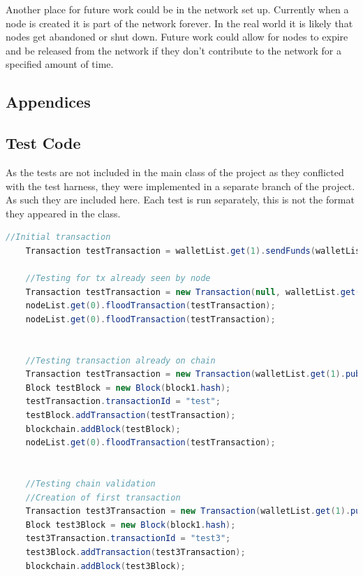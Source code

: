 \documentclass{l4proj}
\begin{document}
Another place for future work could be in the network set up. Currently when a node is created it is part of the
network forever. In the real world it is likely that nodes get abandoned or shut down. Future work could allow for 
nodes to expire and be released from the network if they don't contribute to the network for a specified amount of time.


\begin{appendices}

\chapter{Appendices}

\section{Test Code}
As the tests are not included in the main class of the project as they conflicted with the test harness, they were implemented
in a separate branch of the project. As such they are included here. Each test is run separately, this is not the format they appeared
in the class.

\begin{lstlisting}[language=java, float=h
    , label=lst:testCode]
    //Initial transaction
    Transaction testTransaction = walletList.get(1).sendFunds(walletList.get(2).publicKey, 10);

    //Testing for tx already seen by node
    Transaction testTransaction = new Transaction(null, walletList.get(2).publicKey,10, null, blockchain);
    nodeList.get(0).floodTransaction(testTransaction);
    nodeList.get(0).floodTransaction(testTransaction);


    //Testing transaction already on chain
    Transaction testTransaction = new Transaction(walletList.get(1).publicKey, walletList.get(2).publicKey, 10, null, blockchain);
    Block testBlock = new Block(block1.hash);
    testTransaction.transactionId = "test";
    testBlock.addTransaction(testTransaction);
    blockchain.addBlock(testBlock);
    nodeList.get(0).floodTransaction(testTransaction);


    //Testing chain validation
    //Creation of first transaction
    Transaction test3Transaction = new Transaction(walletList.get(1).publicKey, walletList.get(2).publicKey, 10, null, blockchain);
    Block test3Block = new Block(block1.hash);
    test3Transaction.transactionId = "test3";
    test3Block.addTransaction(test3Transaction);
    blockchain.addBlock(test3Block);


\end{lstlisting}
\end{appendices}
\end{document}
